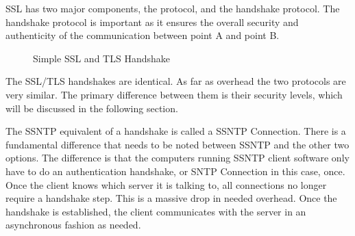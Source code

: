 \documentclass[10pt,letterpaper,onecolumn,draftclsnofoot]{IEEEtran}
\begin{document}
SSL has two major components, the protocol, and the handshake protocol. The
handshake protocol is important as it ensures the overall security and
authenticity of the communication between point A and point B.
~\cite{topdown-ssl}

\begin{figure}[H]
	\begin{center}
		\caption{Simple SSL and TLS Handshake\cite{ibm-diagram}}
	\end{center}
\end{figure}

The SSL/TLS handshakes are identical. As far as overhead the two protocols
are very similar. The primary difference between them is their security levels,
which will be discussed in the following section.

The SSNTP equivalent of a handshake is called a SSNTP Connection. There is a
fundamental difference that needs to be noted between SSNTP and the other two
options. The difference is that the computers running SSNTP client software
only have to do an authentication handshake, or SNTP Connection in this case,
once. Once the client knows which server it is talking to, all connections
no longer require a handshake step. This is a massive drop in needed overhead.
\cite{ssntp} Once the handshake is established, the client communicates with
the server in an asynchronous fashion as needed.
\end{document}
